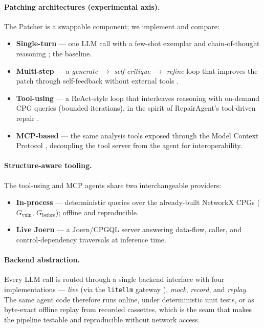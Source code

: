 \documentclass[11pt, a4paper]{article}
\begin{document}
\paragraph{Patching architectures (experimental axis).} The Patcher is a
swappable component; we implement and compare:
\begin{itemize}[leftmargin=*, nosep]
  \item \textbf{Single-turn} --- one LLM call with a few-shot exemplar and
    chain-of-thought reasoning \cite{wei2022cot}; the baseline.
  \item \textbf{Multi-step} --- a \emph{generate $\to$ self-critique $\to$
    refine} loop that improves the patch through self-feedback without external
    tools \cite{madaan2023selfrefine}.
  \item \textbf{Tool-using} --- a ReAct-style loop \cite{yao2023react} that
    interleaves reasoning with on-demand CPG queries (bounded iterations), in the
    spirit of RepairAgent's tool-driven repair \cite{bouzenia2025repairagent}.
  \item \textbf{MCP-based} --- the same analysis tools exposed through the Model
    Context Protocol \cite{mcp2024}, decoupling the tool server from the agent
    for interoperability.
\end{itemize}

\paragraph{Structure-aware tooling.} The tool-using and MCP agents share two
interchangeable providers:
\begin{itemize}[leftmargin=*, nosep]
  \item \textbf{In-process} --- deterministic queries over the already-built
    NetworkX CPGs ($G_{\mathrm{vuln}}$, $G_{\mathrm{before}}$); offline and
    reproducible.
  \item \textbf{Live Joern} --- a Joern/CPGQL server \cite{joern} answering
    data-flow, caller, and control-dependency traversals at inference time.
\end{itemize}

\paragraph{Backend abstraction.} Every LLM call is routed through a single
backend interface with four implementations --- \emph{live} (via the
\texttt{litellm} gateway \cite{litellm}), \emph{mock}, \emph{record}, and
\emph{replay}. The same agent code therefore runs online, under deterministic
unit tests, or as byte-exact offline replay from recorded cassettes, which is the
seam that makes the pipeline testable and reproducible without network access.
\end{document}
